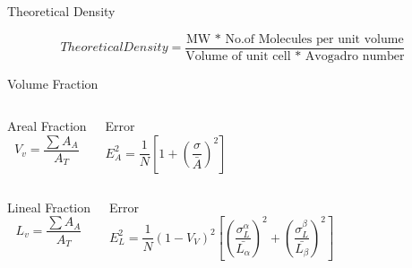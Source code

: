 \documentclass[10pt]{beamer}
\begin{document}
{%
\begin{frame}[fragile]{Theoretical Density}

\begin{equation*}
Theoretical Density = \dfrac{\text{MW * No.of Molecules per unit volume}}{\text{Volume of unit cell * Avogadro number}}
\end{equation*}   
    
\end{frame}
}
{%
\begin{frame}[fragile]{Volume Fraction}


  \begin{columns}[T,onlytextwidth]
 
\begin{block}{Areal Fraction}
\begin{equation*}
V_{v} = \dfrac{\sum A_{A}}{A_{T}}
\end{equation*} 
\end{block}
 

\begin{block}{Error}
\begin{equation*}
E_{A}^{2} = \dfrac{1}{N}\left[ 1+ \left( \dfrac{\sigma}{\bar{A}} \right)^{2} \right]
\end{equation*} 
\end{block}

\end{columns}

  \begin{columns}[T,onlytextwidth]
\begin{block}{Lineal Fraction}
\begin{equation*}
L_{v} = \dfrac{\sum A_{A}}{A_{T}}
\end{equation*} 
\end{block}
 

\begin{block}{Error}
\begin{equation*}
E_{L}^{2} = \dfrac{1}{N}(1-V_{V})^{2}\left[ \left( \dfrac{\sigma^{\alpha}_{L}}{\bar{L_{\alpha}}} \right)^{2} + \left( \dfrac{\sigma^{\beta}_{L}}{\bar{L_{\beta}}} \right)^{2} \right]
\end{equation*}
\end{block}


\end{columns}
\end{frame}}
\end{document}
